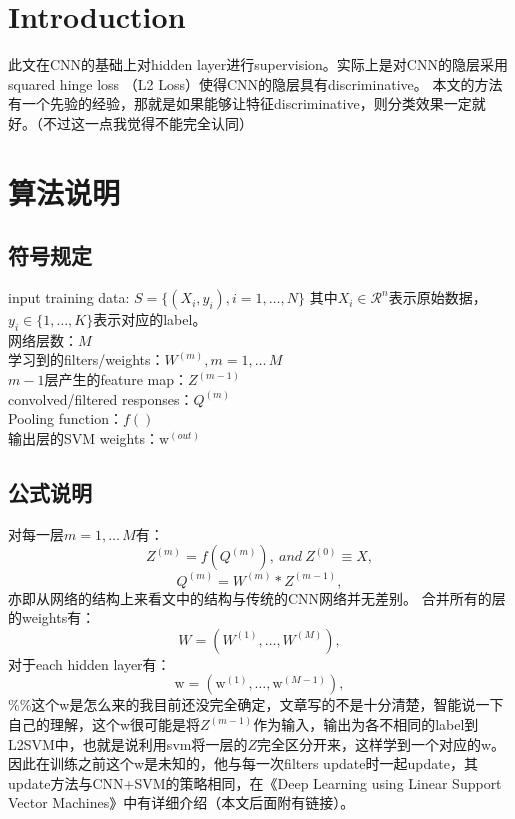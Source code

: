 \documentclass{article}
\begin{document}
\begin{CJK}{UTF8}{gbsn}

\section{Introduction}
此文在CNN的基础上对hidden layer进行supervision。实际上是对CNN的隐层采用squared hinge loss （L2 Loss）使得CNN的隐层具有discriminative。
本文的方法有一个先验的经验，那就是如果能够让特征discriminative，则分类效果一定就好。（不过这一点我觉得不能完全认同）
\section{算法说明}
\subsection{符号规定}
input training data: 
$S=\{(X_i,y_i),i=1,\dots,N\}$ 其中$X_i\in\mathcal{R}^n$表示原始数据，$y_i\in\{1,\dots,K\}$表示对应的label。\\
网络层数：$M$ \\
学习到的filters/weights：$W^{(m)},m=1,\dots\,M$ \\
$m-1$层产生的feature map：$Z^{(m-1)}$ \\
convolved/filtered responses：$Q^{(m)}$ \\
Pooling function：$f()$ \\
输出层的SVM weights：$\mathrm{w}^{(out)}$
\subsection{公式说明}
对每一层$m=1,\dots\,M$有：
\begin{equation} Z^{(m)}=f(Q^{(m)}),~and~Z^{(0)}\equiv X, \end{equation}
\begin{equation} Q^{(m)}=W^{(m)}\ast Z^{(m-1)}, \end{equation}
亦即从网络的结构上来看文中的结构与传统的CNN网络并无差别。
合并所有的层的weights有：
$$W=(W^{(1)},\dots,W^{(M)}),$$
对于each hidden layer有：
$$\mathrm{w}=(\mathrm{w}^{(1)},\dots,\mathrm{w}^{(M-1)}),$$
{\color{red}\%\%}这个w是怎么来的我目前还没完全确定，文章写的不是十分清楚，智能说一下自己的理解，这个w很可能是将$Z^{(m-1)}$作为输入，输出为各不相同的label到L2SVM中，也就是说利用svm将一层的$Z$完全区分开来，这样学到一个对应的w。因此在训练之前这个w是未知的，他与每一次filters update时一起update，其update方法与CNN+SVM的策略相同，在《Deep Learning using Linear Support Vector Machines》中有详细介绍（本文后面附有链接）。


\end{CJK}
\end{document}
